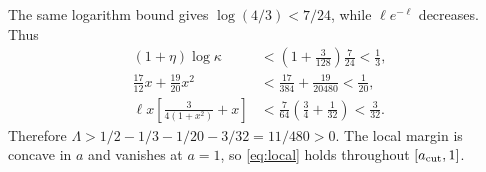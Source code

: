 The same logarithm bound gives \(\log(4/3)<7/24\), while
\(\ell e^{-\ell}\) decreases. Thus
\begin{align*}
 (1+\eta)\log\kappa
 &<\left(1+\frac3{128}\right)\frac7{24}<\frac13,\\
 \frac{17}{12}x+\frac{19}{20}x^2
 &<\frac{17}{384}+\frac{19}{20480}<\frac1{20},\\
 \ell x\left[\frac3{4(1+x^2)}+x\right]
 &<\frac7{64}\left(\frac34+\frac1{32}\right)<\frac3{32}.
\end{align*}
Therefore \(\Lambda>1/2-1/3-1/20-3/32=11/480>0\).
The local margin is concave in \(a\) and vanishes at \(a=1\),
so \eqref{eq:local} holds throughout \([a_{\rm cut},1]\).
